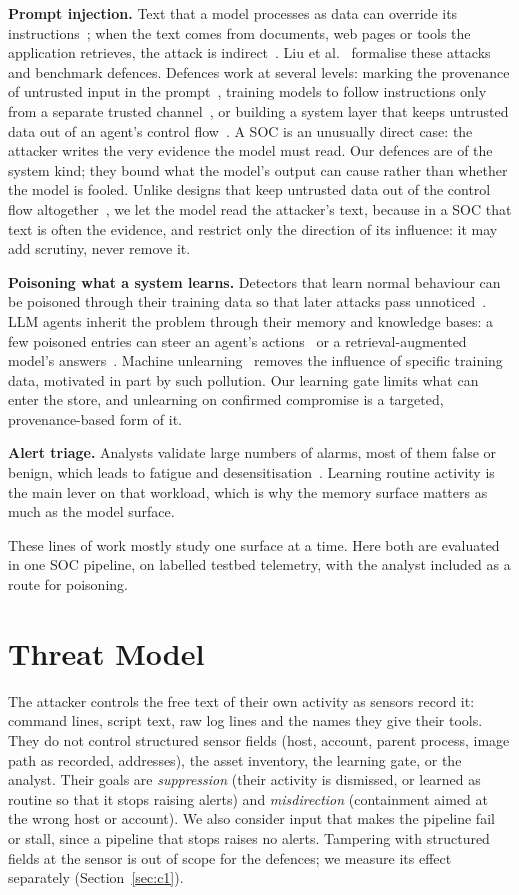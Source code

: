 \documentclass[conference]{IEEEtran}
\begin{document}
\textbf{Prompt injection.} Text that a model processes as data can override its instructions~\cite{perez}; when the
text comes from documents, web pages or tools the application retrieves, the attack is indirect~\cite{greshake}.
Liu et al.~\cite{liu} formalise these attacks and benchmark defences. Defences work at several levels: marking the
provenance of untrusted input in the prompt~\cite{spotlighting}, training models to follow instructions only from a
separate trusted channel~\cite{struq}, or building a system layer that keeps untrusted data out of an agent's
control flow~\cite{camel}. A SOC is an unusually direct case: the attacker writes the very evidence the model must
read. Our defences are of the system kind; they bound what the model's output can cause rather than whether the
model is fooled. Unlike designs that keep untrusted data out of the control flow altogether~\cite{camel}, we let
the model read the attacker's text, because in a SOC that text is often the evidence, and restrict only the
direction of its influence: it may add scrutiny, never remove it.

\textbf{Poisoning what a system learns.} Detectors that learn normal behaviour can be poisoned through their
training data so that later attacks pass unnoticed~\cite{antidote}. LLM agents inherit the problem through their
memory and knowledge bases: a few poisoned entries can steer an agent's actions~\cite{agentpoison} or a
retrieval-augmented model's answers~\cite{poisonedrag}. Machine unlearning~\cite{unlearning} removes the influence
of specific training data, motivated in part by such pollution. Our learning gate limits what can enter the store,
and unlearning on confirmed compromise is a targeted, provenance-based form of it.

\textbf{Alert triage.} Analysts validate large numbers of alarms, most of them false or benign, which leads to
fatigue and desensitisation~\cite{alahmadi}. Learning routine activity is the main lever on that workload, which
is why the memory surface matters as much as the model surface.

These lines of work mostly study one surface at a time. Here both are evaluated in one SOC pipeline, on labelled
testbed telemetry, with the analyst included as a route for poisoning.

\section{Threat Model}
The attacker controls the free text of their own activity as sensors record it: command lines, script text, raw
log lines and the names they give their tools. They do not control structured sensor fields (host, account,
parent process, image path as recorded, addresses), the asset inventory, the learning gate, or the analyst.
Their goals are \emph{suppression} (their activity is dismissed, or learned as routine so that it stops raising
alerts) and \emph{misdirection} (containment aimed at the wrong host or account). We also consider input that makes
the pipeline fail or stall, since a pipeline that stops raises no alerts. Tampering with structured
fields at the sensor is out of scope for the defences; we measure its effect separately (Section~\ref{sec:c1}).
\end{document}
